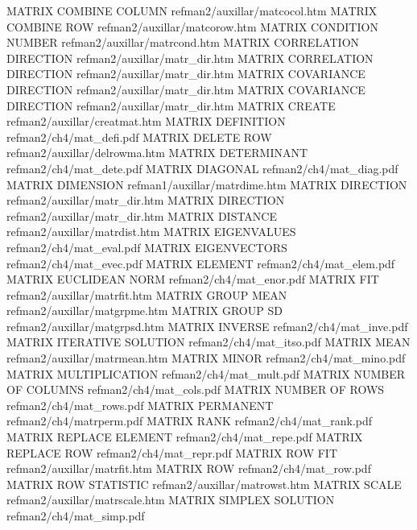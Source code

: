 MATRIX COMBINE COLUMN                   refman2/auxillar/matcocol.htm
MATRIX COMBINE ROW                      refman2/auxillar/matcorow.htm
MATRIX CONDITION NUMBER                 refman2/auxillar/matrcond.htm
MATRIX CORRELATION DIRECTION            refman2/auxillar/matr_dir.htm
MATRIX CORRELATION DIRECTION            refman2/auxillar/matr_dir.htm
MATRIX COVARIANCE DIRECTION             refman2/auxillar/matr_dir.htm
MATRIX COVARIANCE DIRECTION             refman2/auxillar/matr_dir.htm
MATRIX CREATE                           refman2/auxillar/creatmat.htm
MATRIX DEFINITION                       refman2/ch4/mat_defi.pdf
MATRIX DELETE ROW                       refman2/auxillar/delrowma.htm
MATRIX DETERMINANT                      refman2/ch4/mat_dete.pdf
MATRIX DIAGONAL                         refman2/ch4/mat_diag.pdf
MATRIX DIMENSION                        refman1/auxillar/matrdime.htm
MATRIX DIRECTION                        refman2/auxillar/matr_dir.htm
MATRIX DIRECTION                        refman2/auxillar/matr_dir.htm
MATRIX DISTANCE                         refman2/auxillar/matrdist.htm
MATRIX EIGENVALUES                      refman2/ch4/mat_eval.pdf
MATRIX EIGENVECTORS                     refman2/ch4/mat_evec.pdf
MATRIX ELEMENT                          refman2/ch4/mat_elem.pdf
MATRIX EUCLIDEAN NORM                   refman2/ch4/mat_enor.pdf
MATRIX FIT                              refman2/auxillar/matrfit.htm
MATRIX GROUP MEAN                       refman2/auxillar/matgrpme.htm
MATRIX GROUP SD                         refman2/auxillar/matgrpsd.htm
MATRIX INVERSE                          refman2/ch4/mat_inve.pdf
MATRIX ITERATIVE SOLUTION               refman2/ch4/mat_itso.pdf
MATRIX MEAN                             refman2/auxillar/matrmean.htm
MATRIX MINOR                            refman2/ch4/mat_mino.pdf
MATRIX MULTIPLICATION                   refman2/ch4/mat_mult.pdf
MATRIX NUMBER OF COLUMNS                refman2/ch4/mat_cols.pdf
MATRIX NUMBER OF ROWS                   refman2/ch4/mat_rows.pdf
MATRIX PERMANENT                        refman2/ch4/matrperm.pdf
MATRIX RANK                             refman2/ch4/mat_rank.pdf
MATRIX REPLACE ELEMENT                  refman2/ch4/mat_repe.pdf
MATRIX REPLACE ROW                      refman2/ch4/mat_repr.pdf
MATRIX ROW FIT                          refman2/auxillar/matrfit.htm
MATRIX ROW                              refman2/ch4/mat_row.pdf
MATRIX ROW STATISTIC                    refman2/auxillar/matrowst.htm
MATRIX SCALE                            refman2/auxillar/matrscale.htm
MATRIX SIMPLEX SOLUTION                 refman2/ch4/mat_simp.pdf
